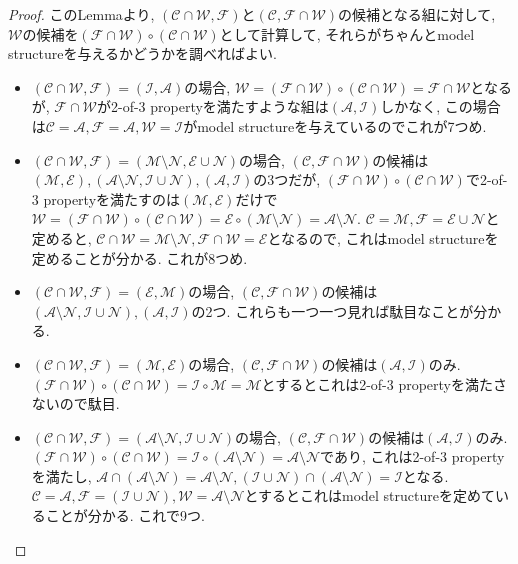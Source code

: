 \documentclass[. /main]{subfiles}
\theoremstyle{definition}
\begin{document}
\begin{proof}
このLemmaより, $(\mathcal{C} \cap \mathcal{W},  \mathcal{F})$と$(\mathcal{C},  \mathcal{F} \cap \mathcal{W})$の候補となる組に対して, $\mathcal{W}$の候補を$(\mathcal{F} \cap \mathcal{W}) \circ (\mathcal{C} \cap \mathcal{W})$として計算して, それらがちゃんとmodel structureを与えるかどうかを調べればよい. 
\begin{itemize}
\item $(\mathcal{C} \cap \mathcal{W},  \mathcal{F})=(\mathcal{I},  \mathcal{A})$の場合, $\mathcal{W}=(\mathcal{F} \cap \mathcal{W}) \circ (\mathcal{C} \cap \mathcal{W})=\mathcal{F} \cap \mathcal{W}$となるが, $\mathcal{F} \cap \mathcal{W}$が2-of-3 propertyを満たすような組は$(\mathcal{A},  \mathcal{I})$しかなく, この場合は$\mathcal{C}=\mathcal{A},  \mathcal{F}=\mathcal{A},  \mathcal{W}=\mathcal{I}$がmodel structureを与えているのでこれが7つめ. 
\item $(\mathcal{C} \cap \mathcal{W},  \mathcal{F})=(\mathcal{M} \setminus \mathcal{N},  \mathcal{E} \cup \mathcal{N})$の場合, $(\mathcal{C},  \mathcal{F} \cap \mathcal{W})$の候補は$(\mathcal{M},  \mathcal{E}),  (\mathcal{A} \setminus \mathcal{N},  \mathcal{I} \cup \mathcal{N}),  (\mathcal{A},  \mathcal{I})$の3つだが, $(\mathcal{F} \cap \mathcal{W}) \circ (\mathcal{C} \cap \mathcal{W})$で2-of-3 propertyを満たすのは$(\mathcal{M},  \mathcal{E})$だけで$\mathcal{W}=(\mathcal{F} \cap \mathcal{W}) \circ (\mathcal{C} \cap \mathcal{W})=\mathcal{E} \circ (\mathcal{M} \setminus \mathcal{N})=\mathcal{A} \setminus \mathcal{N}$. $\mathcal{C}=\mathcal{M},  \mathcal{F}=\mathcal{E} \cup \mathcal{N}$と定めると, $\mathcal{C} \cap \mathcal{W}=\mathcal{M} \setminus \mathcal{N},  \mathcal{F} \cap \mathcal{W}=\mathcal{E}$となるので, これはmodel structureを定めることが分かる. これが8つめ. 
\item $(\mathcal{C} \cap \mathcal{W},  \mathcal{F})=(\mathcal{E},  \mathcal{M})$の場合, $(\mathcal{C},  \mathcal{F} \cap \mathcal{W})$の候補は$(\mathcal{A} \setminus \mathcal{N},  \mathcal{I} \cup \mathcal{N}),  (\mathcal{A},  \mathcal{I})$の2つ. これらも一つ一つ見れば駄目なことが分かる. 
\item $(\mathcal{C} \cap \mathcal{W},  \mathcal{F})=(\mathcal{M},  \mathcal{E})$の場合, $(\mathcal{C},  \mathcal{F} \cap \mathcal{W})$の候補は$(\mathcal{A},  \mathcal{I})$のみ. $(\mathcal{F} \cap \mathcal{W}) \circ (\mathcal{C} \cap \mathcal{W})=\mathcal{I} \circ \mathcal{M}=\mathcal{M}$とするとこれは2-of-3 propertyを満たさないので駄目. 
\item $(\mathcal{C} \cap \mathcal{W},  \mathcal{F})=(\mathcal{A} \setminus \mathcal{N},  \mathcal{I} \cup \mathcal{N})$の場合, $(\mathcal{C},  \mathcal{F} \cap \mathcal{W})$の候補は$(\mathcal{A},  \mathcal{I})$のみ. $(\mathcal{F} \cap \mathcal{W}) \circ (\mathcal{C} \cap \mathcal{W})=\mathcal{I} \circ (\mathcal{A} \setminus \mathcal{N})=\mathcal{A} \setminus \mathcal{N}$であり, これは2-of-3 propertyを満たし, $\mathcal{A} \cap (\mathcal{A} \setminus \mathcal{N})=\mathcal{A} \setminus \mathcal{N},  (\mathcal{I} \cup \mathcal{N}) \cap (\mathcal{A} \setminus \mathcal{N})=\mathcal{I}$となる. $\mathcal{C}=\mathcal{A},  \mathcal{F}=(\mathcal{I} \cup \mathcal{N}),  \mathcal{W}=\mathcal{A} \setminus \mathcal{N}$とするとこれはmodel structureを定めていることが分かる. これで9つ. 

\end{itemize}
\end{proof}
\end{document}
